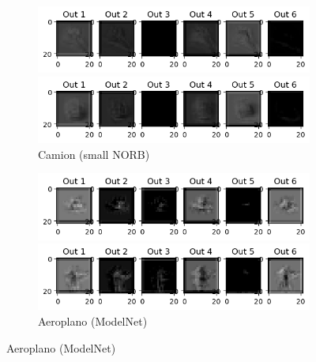 \documentclass[italian,12pt,a4paper,oneside,final]{report}
\begin{document}
\begin{figure}[ht]
	\begin{subfigure}{0.4\textwidth}
		\begin{subcaptionblock}{1.2\textwidth}
			\centering
			\includegraphics[width=1.2\linewidth]{smallnorb_M1_out_airplane.png}
			\caption{Aeroplano (small NORB)}
			\label{fig:smallnorb_M1_out_airplane}
		\end{subcaptionblock}%
		\hfill
		\begin{subcaptionblock}{1.2\textwidth}
			\centering
			\includegraphics[width=1.2\linewidth]{smallnorb_M1_out_truck.png}
			\caption{Camion (small NORB)}
			\label{fig:smallnorb_M1_out_truck}
		\end{subcaptionblock}%
	\end{subfigure}
	\hfill
	\begin{subfigure}{0.4\textwidth}
		\begin{subcaptionblock}{1.2\textwidth}
			\centering
			\includegraphics[width=1.2\linewidth]{modelnet_M1_out_airplane.png}
			\caption{Aeroplano (ModelNet)}
			\label{fig:modelnet_M1_out_airplane}
		\end{subcaptionblock}%
		\hfill
		\begin{subcaptionblock}{1.2\textwidth}
			\centering
			\includegraphics[width=1.2\linewidth]{modelnet_M1_out_human.png}

\end{subcaptionblock}
\end{subfigure}
\end{figure}
\end{document}
